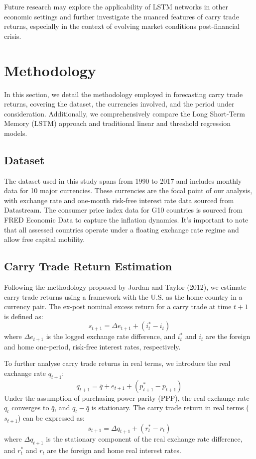 \documentclass[a4paper,10pt]{article}
\begin{document}
Future research may explore the applicability of LSTM networks in other economic settings and further investigate the nuanced features of carry trade returns, especially in the context of evolving market conditions post-financial crisis.


\section{Methodology}

In this section, we detail the methodology employed in forecasting carry trade returns, covering the dataset, the currencies involved, and the period under consideration. Additionally, we comprehensively compare the Long Short-Term Memory (LSTM) approach and traditional linear and threshold regression models.

\subsection{Dataset}

The dataset used in this study spans from 1990 to 2017 and includes monthly data for 10 major currencies. These currencies are the focal point of our analysis, with exchange rate and one-month risk-free interest rate data sourced from Datastream. The consumer price index data for G10 countries is sourced from FRED Economic Data to capture the inflation dynamics. It's important to note that all assessed countries operate under a floating exchange rate regime and allow free capital mobility.

\subsection{Carry Trade Return Estimation}

Following the methodology proposed by Jordan and Taylor (2012), we estimate carry trade returns using a framework with the U.S. as the home country in a currency pair. The ex-post nominal excess return for a carry trade at time \(t+1\) is defined as:
\[ s_{t+1} = \Delta e_{t+1} + (i^*_t - i_t) \]
where \(\Delta e_{t+1}\) is the logged exchange rate difference, and \(i^*_t\) and \(i_t\) are the foreign and home one-period, risk-free interest rates, respectively.

To further analyse carry trade returns in real terms, we introduce the real exchange rate \(q_{t+1}\):
\[ q_{t+1} = \bar{q} + e_{t+1} + (p^*_{t+1} - p_{t+1}) \]
Under the assumption of purchasing power parity (PPP), the real exchange rate \(q_t\) converges to \(\bar{q}\), and \(q_t - \bar{q}\) is stationary. The carry trade return in real terms (\(s_{t+1}\)) can be expressed as:
\[ s_{t+1} = \Delta q_{t+1} + (r^*_t - r_t) \]
where \(\Delta q_{t+1}\) is the stationary component of the real exchange rate difference, and \(r^*_t\) and \(r_t\) are the foreign and home real interest rates.
\end{document}
